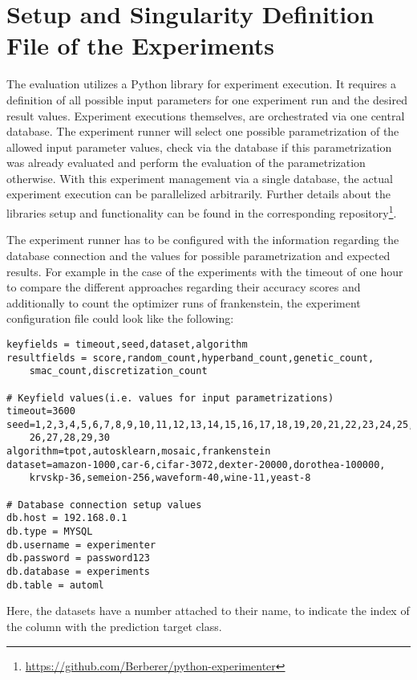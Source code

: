 \section{Setup and Singularity Definition File of the Experiments}
\label{sec:appendix:singularity}
The evaluation utilizes a Python library for experiment execution.
It requires a definition of all possible input parameters for one experiment run and the desired result values.\newline
Experiment executions themselves, are orchestrated via one central database.
The experiment runner will select one possible parametrization of the allowed input parameter values, check via the database if this parametrization was already evaluated and perform the evaluation of the parametrization otherwise.
With this experiment management via a single database, the actual experiment execution can be parallelized arbitrarily.
Further details about the libraries setup and functionality can be found in the corresponding repository\footnote{\url{https://github.com/Berberer/python-experimenter}}.

The experiment runner has to be configured with the information regarding the database connection and the values for possible parametrization and expected results.
For example in the case of the experiments with the timeout of one hour to compare the different approaches regarding their accuracy scores and additionally to count the optimizer runs of frankenstein, the experiment configuration file could look like the following:
\begin{verbatim}
keyfields = timeout,seed,dataset,algorithm
resultfields = score,random_count,hyperband_count,genetic_count,
    smac_count,discretization_count

# Keyfield values(i.e. values for input parametrizations)
timeout=3600
seed=1,2,3,4,5,6,7,8,9,10,11,12,13,14,15,16,17,18,19,20,21,22,23,24,25,
    26,27,28,29,30
algorithm=tpot,autosklearn,mosaic,frankenstein
dataset=amazon-1000,car-6,cifar-3072,dexter-20000,dorothea-100000,
    krvskp-36,semeion-256,waveform-40,wine-11,yeast-8

# Database connection setup values
db.host = 192.168.0.1
db.type = MYSQL
db.username = experimenter
db.password = password123
db.database = experiments
db.table = automl
\end{verbatim}
Here, the datasets have a number attached to their name, to indicate the index of the column with the prediction target class.

